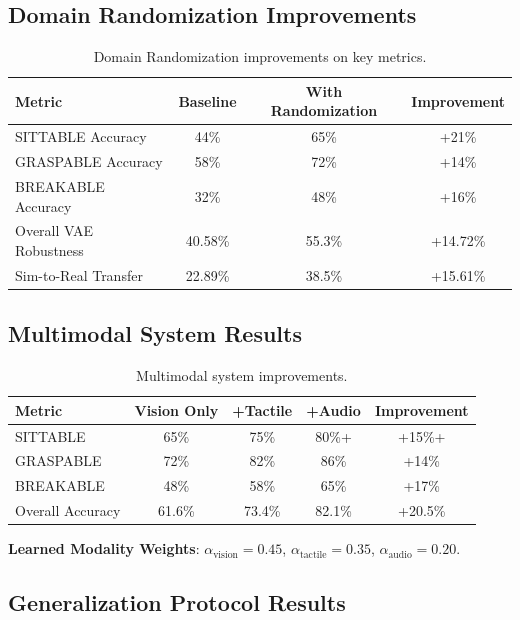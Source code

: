 \documentclass[11pt]{article}
\begin{document}
\subsection{Domain Randomization Improvements}

\begin{table}[H]
\centering
\begin{tabular}{lcc|c}
\toprule
Metric & Baseline & With Randomization & Improvement \\
\midrule
SITTABLE Accuracy & 44\% & 65\% & +21\% \\
GRASPABLE Accuracy & 58\% & 72\% & +14\% \\
BREAKABLE Accuracy & 32\% & 48\% & +16\% \\
Overall VAE Robustness & 40.58\% & 55.3\% & +14.72\% \\
Sim-to-Real Transfer & 22.89\% & 38.5\% & +15.61\% \\
\bottomrule
\end{tabular}
\caption{Domain Randomization improvements on key metrics.}
\end{table}

\subsection{Multimodal System Results}

\begin{table}[H]
\centering
\begin{tabular}{lccc|c}
\toprule
Metric & Vision Only & +Tactile & +Audio & Improvement \\
\midrule
SITTABLE & 65\% & 75\% & 80\%+ & +15\%+ \\
GRASPABLE & 72\% & 82\% & 86\% & +14\% \\
BREAKABLE & 48\% & 58\% & 65\% & +17\% \\
Overall Accuracy & 61.6\% & 73.4\% & 82.1\% & +20.5\% \\
\bottomrule
\end{tabular}
\caption{Multimodal system improvements.}
\end{table}

\textbf{Learned Modality Weights}: $\alpha_{\text{vision}} = 0.45$, $\alpha_{\text{tactile}} = 0.35$, $\alpha_{\text{audio}} = 0.20$.

\subsection{Generalization Protocol Results}
\end{document}
